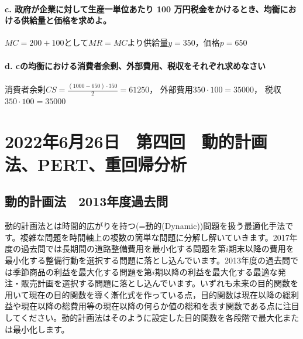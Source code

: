 \documentclass{jsarticle}
\begin{document}
\paragraph{c. 政府が企業に対して生産一単位あたり 100 万円税金をかけるとき、均衡における供給量と価格を求めよ。}

$MC=200+100$として$MR=MC$より供給量$y=350$，価格$p=650$

\paragraph{d. cの均衡における消費者余剰、外部費用、税収をそれぞれ求めなさい}

消費者余剰$CS=\frac{(1000-650)\cdot350}{2}=61250$，
外部費用$350\cdot100=35000$，
税収$350\cdot100=35000$

\section{2022年6月26日　第四回　動的計画法、PERT、重回帰分析}

\subsection{動的計画法　2013年度過去問\label{dynamic2013}}

動的計画法とは時間的広がりを持つ(=動的(Dynamic))問題を扱う最適化手法です。複雑な問題を時間軸上の複数の簡単な問題に分解し解いていきます。2017年度の過去問では長期間の道路整備費用を最小化する問題を第$i$期末以降の費用を最小化する整備行動を選択する問題に落とし込んでいます。2013年度の過去問では季節商品の利益を最大化する問題を第$i$期以降の利益を最大化する最適な発注・販売計画を選択する問題に落とし込んでいます。いずれも未来の目的関数を用いて現在の目的関数を導く漸化式を作っている点，目的関数は現在以降の総利益や現在以降の総費用等の現在以降の何らか値の総和を表す関数である点に注目してください。動的計画法はそのように設定した目的関数を各段階で最大化または最小化します。
\end{document}
